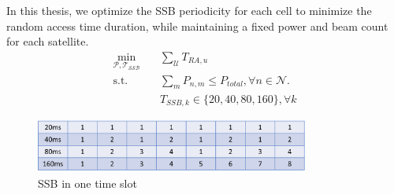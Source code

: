 In this thesis, we optimize the SSB periodicity for each cell to minimize the random access time 
duration, while maintaining a fixed power and beam count for each satellite.
\begin{align*}
    \min_{\mathcal{P}, \mathcal{T_{SSB}}} \quad & \sum_\mathcal{U} T_{RA,u} \\
    \text{s.t.} \quad & \sum_m P_{n,m} \leq P_{total}, \forall n \in \mathcal{N}. \\
    & T_{SSB, k}\in\{20, 40, 80, 160\}, \forall k
    \end{align*}
    \begin{figure}[h!]
        \centering
        \includegraphics[width=0.8\textwidth]{SSB.png}
        \caption{SSB in one time slot}
        \label{fig_SSB}
    \end{figure}
    

